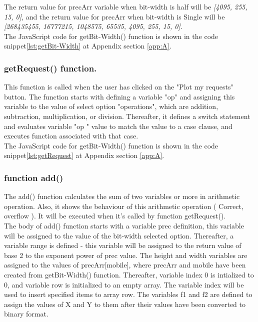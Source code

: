 \documentclass[11pt]{article}
\begin{document}
The return value for precArr variable when bit-width is half will be \textit{[4095, 255, 15, 0]}, and the return value for precArr when bit-width is Single will be \textit{[268435455, 16777215, 1048575, 65535, 4095, 255, 15, 0]}.\\

The JavaScript code for getBit-Width() function is shown in the code snippet\ref{lst:getBit-Width} at Appendix section \ref{app:A}.\\

\subsubsection{getRequest() function.} 
This function is called when the user has clicked on the "Plot my requests" button. The function starts with defining a variable "op" and assigning this variable to the value of select option "operations", which are addition, subtraction, multiplication, or division. Thereafter, it defines a switch statement and evaluates variable "op " value to match the value to a case clause, and executes function associated with that case.\\
The JavaScript code for getBit-Width() function is shown in the code snippet\ref{lst:getRequest} at Appendix section \ref{app:A}.\\

\subsubsection{function add()}
The add() function calculates the sum of two variables or more in arithmetic operation. Also, it shows the behaviour of this arithmetic operation ( Correct, overflow ). It will be executed when it's called by function getRequest().\\
The body of add() function starts with a variable prec definition, this variable will be assigned to the value of the bit-width selected option. Thereafter, a variable range is defined - this variable will be assigned to the return value of base 2 to the exponent power of prec value.
The height and width variables are assigned to the values of precArr[mobile], where precArr and mobile have been created from getBit-Width() function.
Thereafter, variable index 0 is intialized to 0, and variable row is initialized to an empty array. The variable index will be used to insert specified items to array row. The variables f1 and f2 are defined to assign the values of X and Y to them after their values have been converted to binary format.\\
\end{document}
